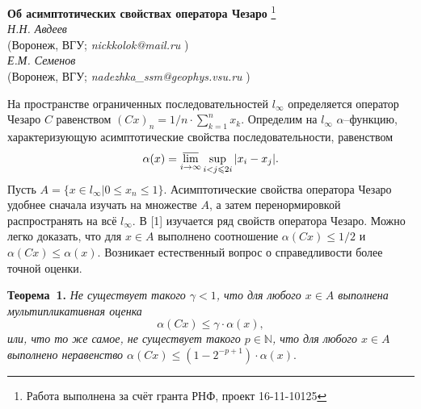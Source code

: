 \begin{center}{ \bf  Об асимптотических свойствах оператора Чезаро}%
\footnote{Работа выполнена за счёт гранта РНФ, проект 16-11-10125}
\\
{\it Н.Н. Авдеев } \\
(Воронеж, ВГУ; {\it nickkolok@mail.ru} ) \\
{\it Е.М. Семенов } \\
(Воронеж, ВГУ; {\it nadezhka\_ssm@geophys.vsu.ru}
)
\end{center}


\setcounter{equation}{0}


На пространстве ограниченных последовательностей $l_\infty$ определяется оператор Чезаро $C$
равенством
$
	(Cx)_n = {1}/{n} \cdot \sum_{k=1}^n x_k.
$
Определим на $l_\infty$ $\alpha$--функцию,
характеризующую асимптотические свойства последовательности,
равенством
$$
	\alpha(x) = \varlimsup_{i\to\infty}\sup_{i < j \leqslant 2i} |x_i - x_j|.
$$
Пусть $A = \{x\in l_\infty | 0 \leqslant x_n \leqslant 1\}$.
Асимптотические свойства оператора Чезаро удобнее сначала изучать на множестве $A$,
а затем перенормировкой распространять на всё $l_\infty$.
В [1] изучается ряд свойств оператора Чезаро.
Можно легко доказать, что для $x\in A$ выполнено соотношение $\alpha(Cx) \leqslant 1/2$
и $\alpha(Cx) \leqslant \alpha(x)$.
Возникает естественный вопрос о справедливости более точной оценки.

\textbf{Теорема~1.}
{\it
	Не существует такого $\gamma < 1$,
	что для любого $x\in A$ выполнена мультипликативная оценка
	$$
		\alpha(Cx) \leqslant \gamma \cdot \alpha(x)
	,
	$$
или, что то же самое, не существует такого $p\in \mathbb{N}$,
	что для любого $x\in A$ выполнено неравенство
	$
		\alpha(Cx) \leqslant (1-2^{-p+1})\cdot \alpha(x).
	$
}

